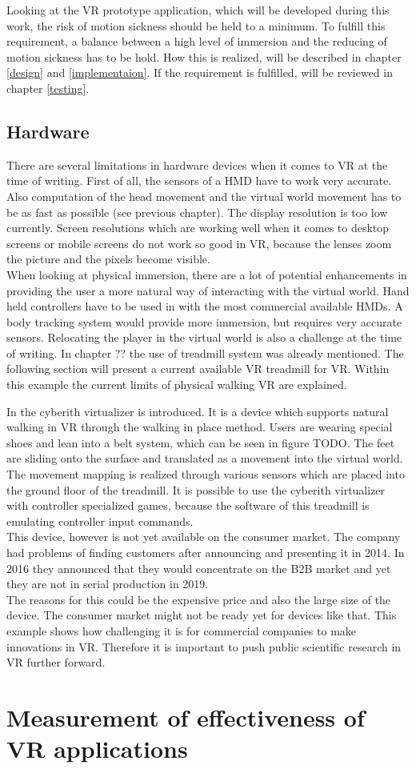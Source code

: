 Looking at the VR prototype application, which will be developed during this work, the risk of motion sickness should be held to a minimum. To fulfill this requirement, a balance between a high level of immersion and the reducing of motion sickness has to be hold. How this is realized, will be described in chapter \ref{design} and \ref{implementaion}. If the requirement is fulfilled, will be reviewed in chapter \ref{testing}.

\subsection{Hardware}
There are several limitations in hardware devices when it comes to VR at the time of writing. First of all, the sensors of a HMD have to work very accurate. Also computation of the head movement and the virtual world movement has to be as fast as possible (see previous chapter). The display resolution is too low currently. Screen resolutions which are working well when it comes to desktop screens or mobile screens do not work so good in VR, because the lenses zoom the picture and the pixels become visible. \\
When looking at physical immersion, there are a lot of potential enhancements in providing the user a more natural way of interacting with the virtual world. Hand held controllers have to be used in with  the most commercial available HMDs. A body tracking system would provide more immersion, but requires very accurate sensors.
Relocating the player in the virtual world is also a challenge at the time of writing. In chapter ?? the use of treadmill system was already mentioned. The following section will present a current available VR treadmill for VR. Within this example the current limits of physical walking VR are explained.

In \cite{Cakmak.2014} the cyberith virtualizer is introduced. It is a device which supports natural walking in VR through the walking in place method. Users are wearing special shoes and lean into a belt system, which can be seen in figure TODO. The feet are sliding onto the surface and translated as a movement into the virtual world. The movement mapping is realized through various sensors which are placed into the ground floor of the treadmill. It is possible to use the cyberith virtualizer with controller specialized games, because the software of this treadmill is emulating controller input commands.\\
This device, however is not yet available on the consumer market. The company had problems of finding customers after announcing and presenting it in 2014. In 2016 they announced that they would concentrate on the B2B market and yet they are not in serial production in 2019. \citep{TODO}\\
The reasons for this could be the expensive price and also the large size of the device. The consumer market might not be ready yet for devices like that. This example shows how challenging it is for commercial companies to make innovations in VR. Therefore it is important to push public scientific research in VR further forward.

\section{Measurement of effectiveness of VR applications}
